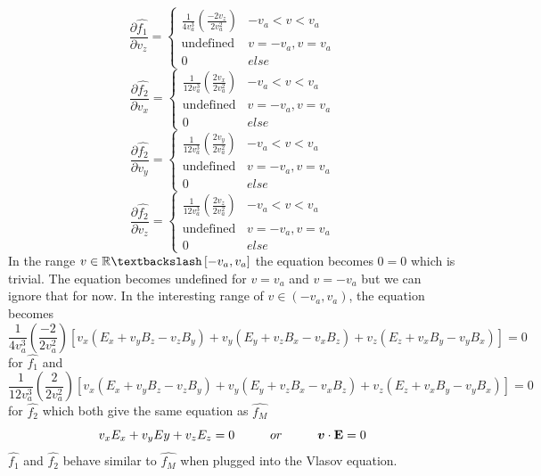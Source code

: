 \documentclass[12pt]{article}
\begin{document}
	\[ \frac{\displaystyle \partial \hat{f_{1}}}{\displaystyle \partial v_{z}} = 
	\begin{cases} 
		\frac{1}{4 v_{a}^{3}} \left(\frac{- 2 v_{z}}{2 v_{a}^2}\right) & -v_{a} < v < v_{a} \\
		\mathrm{undefined} & v = - v_{a}, v = v_{a} \\
		0 & else 
	\end{cases}
	\]
	\[ \frac{\displaystyle \partial \hat{f_{2}}}{\displaystyle \partial v_{x}} = 
	\begin{cases} 
		\frac{1}{12 v_{a}^{3}} \left(\frac{2 v_{x}}{2 v_{a}^2}\right) & -v_{a} < v < v_{a} \\
		\mathrm{undefined} & v = - v_{a}, v = v_{a} \\
		0 & else 
	\end{cases}
	\]
	\[ \frac{\displaystyle \partial \hat{f_{2}}}{\displaystyle \partial v_{y}} = 
	\begin{cases} 
		\frac{1}{12 v_{a}^{3}} \left(\frac{2 v_{y}}{2 v_{a}^2}\right) & -v_{a} < v < v_{a} \\
		\mathrm{undefined} & v = - v_{a}, v = v_{a} \\
		0 & else 
	\end{cases}
	\]
	\[ \frac{\displaystyle \partial \hat{f_{2}}}{\displaystyle \partial v_{z}} = 
	\begin{cases} 
		\frac{1}{12 v_{a}^{3}} \left(\frac{2 v_{z}}{2 v_{a}^2}\right) & -v_{a} < v < v_{a} \\
		\mathrm{undefined} & v = - v_{a}, v = v_{a} \\
		0 & else 
	\end{cases}
	\]
	In the range $v \in \mathbb{R} \textbackslash \left[-v_{a}, v_{a}\right] $ the equation becomes $0 = 0$ which is trivial. The equation becomes undefined for $v = v_{a}$ and 
	$v = - v_{a}$ but we can ignore that for now. In the interesting range of $v \in \left(-v_{a}, v_{a}\right) $, the equation becomes 
	$$ \frac{1}{4 v_{a}^{3}} \left(\frac{- 2}{2 v_{a}^2}\right) \left[v_{x}\left( E_{x} + v_{y} B_{z} - v_{z} B_{y} \right) + v_{y} \left( E_{y} + v_{z} B_{x} - v_{x} B_{z} \right) + v_{z} \left(E_{z} + v_{x} B_{y} - v_{y} B_{x}\right) \right] = 0 $$
	for $\hat{f_{1}}$ and
	$$ \frac{1}{12 v_{a}^{3}} \left(\frac{2}{2 v_{a}^2}\right) \left[v_{x}\left( E_{x} + v_{y} B_{z} - v_{z} B_{y} \right) + v_{y} \left( E_{y} + v_{z} B_{x} - v_{x} B_{z} \right) + v_{z} \left(E_{z} + v_{x} B_{y} - v_{y} B_{x}\right) \right] = 0 $$
	for $\hat{f_{2}}$ which both give the same equation as $\widehat{f_{M}}$
	$$v_{x} E_{x} + v_{y} E{y} + v_{z} E_{z} = 0 \hspace{1cm}\mathnormal{or}\hspace{1cm}\boldsymbol{v} \cdot \mathrm{\mathbf{E}} = 0$$
	\noindent $\hat{f_{1}}$ and $\hat{f_{2}}$ behave similar to $\hat{f_{M}}$ when plugged into the Vlasov equation.
	
\end{document}
